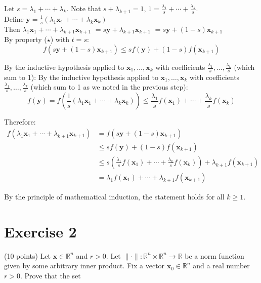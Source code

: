 \documentclass{article}
\begin{document}
Let $s = \lambda_1 + \cdots + \lambda_k$. Note that $s + \lambda_{k+1} = 1$, $1 = \frac{\lambda_1}{s} + \cdots + \frac{\lambda_{k}}{s}$. \\

Define $\mathbf{y} = \frac{1}{s}(\lambda_1\mathbf{x}_1 + \cdots + \lambda_k\mathbf{x}_k)$ \\

Then $\lambda_1\mathbf{x}_1 + \cdots + \lambda_{k+1}\mathbf{x}_{k+1}$ 
$= s\mathbf{y} + \lambda_{k+1}\mathbf{x}_{k+1}$
$= s\mathbf{y} + (1-s)\mathbf{x}_{k+1}$ \\

By property ($\star$) with $t = s$:
$$f(s\mathbf{y} + (1-s)\mathbf{x}_{k+1}) \leq sf(\mathbf{y}) + (1-s)f(\mathbf{x}_{k+1})$$

By the inductive hypothesis applied to $\mathbf{x}_1,\ldots,\mathbf{x}_k$ with coefficients $\frac{\lambda_1}{s},\ldots,\frac{\lambda_k}{s}$ (which sum to 1):
By the inductive hypothesis applied to $\mathbf{x}_1,\ldots,\mathbf{x}_k$ with coefficients $\frac{\lambda_1}{s},\ldots,\frac{\lambda_k}{s}$ (which sum to 1 as we noted in the previous step):
$$f(\mathbf{y}) = f(\frac{1}{s}(\lambda_1\mathbf{x}_1 + \cdots + \lambda_k\mathbf{x}_k)) \leq \frac{\lambda_1}{s}f(\mathbf{x}_1) + \cdots + \frac{\lambda_k}{s}f(\mathbf{x}_k)$$

Therefore:
\begin{align*}
f(\lambda_1\mathbf{x}_1 + \cdots + \lambda_{k+1}\mathbf{x}_{k+1}) &= f(s\mathbf{y} + (1-s)\mathbf{x}_{k+1}) \\
&\leq sf(\mathbf{y}) + (1-s)f(\mathbf{x}_{k+1}) \\
&\leq s(\frac{\lambda_1}{s}f(\mathbf{x}_1) + \cdots + \frac{\lambda_k}{s}f(\mathbf{x}_k)) + \lambda_{k+1}f(\mathbf{x}_{k+1}) \\
&= \lambda_1f(\mathbf{x}_1) + \cdots + \lambda_{k+1}f(\mathbf{x}_{k+1})
\end{align*}

By the principle of mathematical induction, the statement holds for all $k \geq 1$.

\newpage

\section*{Exercise 2}
(10 points) Let $\mathbf{x} \in \mathbb{R}^n$ and $r > 0$. Let $\|\cdot\|: \mathbb{R}^n \times \mathbb{R}^n \to \mathbb{R}$ be a norm function given by some arbitrary inner product. Fix a vector $\mathbf{x}_0 \in \mathbb{R}^n$ and a real number $r > 0$. Prove that the set
\end{document}
